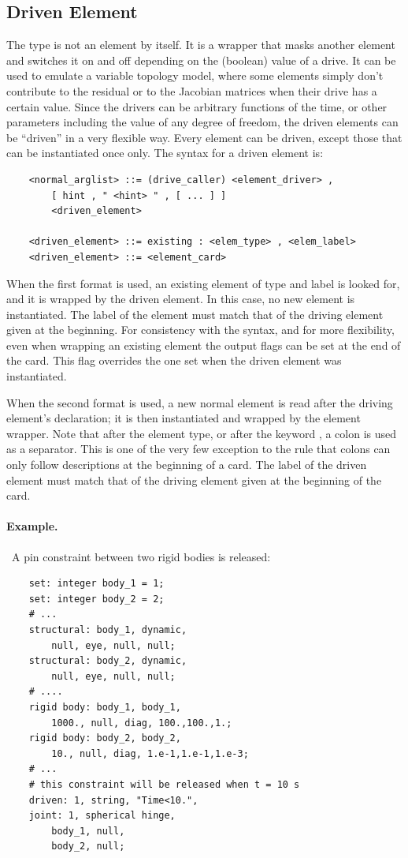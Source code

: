 \subsection{Driven Element}\label{sec:EL:BASE:DRIVEN}
The  type is not an element by itself. It is a wrapper that
masks another element and switches it on and off depending on the (boolean)
value of a drive. It can be used to emulate a variable topology model,
where some elements simply don't contribute to the residual
or to the Jacobian matrices when their drive has a certain value.
Since the drivers can be arbitrary functions of the time, 
or other parameters including the value of any degree of freedom, 
the driven elements can be ``driven'' in a very flexible way.
Every element can be driven, except those that can be instantiated once only.
The syntax for a driven element is:
\begin{verbatim}
    <normal_arglist> ::= (drive_caller) <element_driver> ,
        [ hint , " <hint> " , [ ... ] ]
        <driven_element>

    <driven_element> ::= existing : <elem_type> , <elem_label>
    <driven_element> ::= <element_card>
\end{verbatim}
When the first format is used, an existing element 
of type  and label  is looked for, 
and it is wrapped by the driven element.
In this case, no new element is instantiated.
The label of the element must match that of the driving element given 
at the beginning.
For consistency with the syntax, and for more flexibility, 
even when wrapping an existing element the output flags can be set
at the end of the card.
This flag overrides the one set when the driven element was instantiated.

When the second format is used, a new normal element is read 
after the driving element's declaration; it is then instantiated 
and wrapped by the  element wrapper.
Note that after the element type,
or after the keyword , a colon is used as a separator.
This is one of the very few  exception to the rule that colons 
can only follow descriptions at the beginning of a card.
The label of the driven element must match that of the driving element 
given at the beginning of the card.

\paragraph{Example.} \
A pin constraint between two rigid bodies is released:
\begin{verbatim}
    set: integer body_1 = 1;
    set: integer body_2 = 2;
    # ...
    structural: body_1, dynamic,
        null, eye, null, null;
    structural: body_2, dynamic,
        null, eye, null, null;
    # ....
    rigid body: body_1, body_1,
        1000., null, diag, 100.,100.,1.;
    rigid body: body_2, body_2,
        10., null, diag, 1.e-1,1.e-1,1.e-3;
    # ...
    # this constraint will be released when t = 10 s
    driven: 1, string, "Time<10.",
    joint: 1, spherical hinge,
        body_1, null,
        body_2, null;
\end{verbatim}

